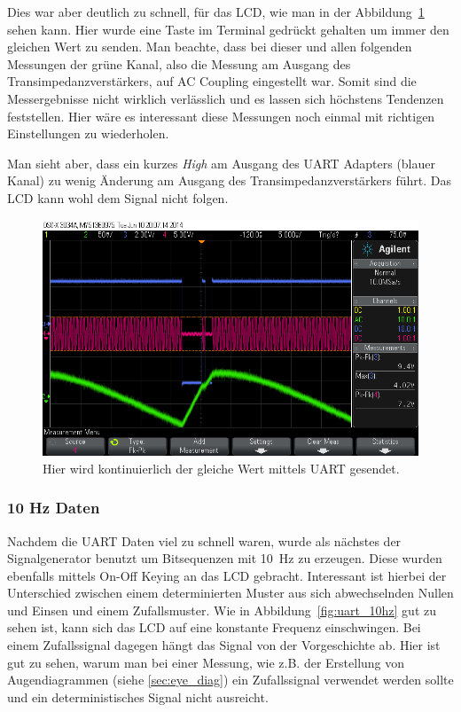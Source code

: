 \documentclass[12pt,a4paper]{article}
\begin{document}
Dies war aber deutlich zu schnell, für das LCD, wie man in der Abbildung~\ref{fig:uart_continous_key} sehen kann. Hier wurde eine Taste im Terminal gedrückt gehalten um immer den gleichen Wert zu senden. Man beachte, dass bei dieser und allen folgenden Messungen der grüne Kanal, also die Messung am Ausgang des Transimpedanzverstärkers, auf AC Coupling eingestellt war. Somit sind die Messergebnisse nicht wirklich verlässlich und es lassen sich höchstens Tendenzen feststellen. Hier wäre es interessant diese Messungen noch einmal mit richtigen Einstellungen zu wiederholen.

Man sieht aber, dass ein kurzes \textit{High} am Ausgang des UART Adapters (blauer Kanal) zu wenig Änderung am Ausgang des Transimpedanzverstärkers führt. Das LCD kann wohl dem Signal nicht folgen.


\begin{figure}[H]
  \centering
    \includegraphics[width=\textwidth]{../measurements/20140610/uart_continous_key/scope_0.png}
  \caption{Hier wird kontinuierlich der gleiche Wert mittels UART gesendet.}
  \label{fig:uart_continous_key}
\end{figure}

\subsubsection{10 Hz Daten}
Nachdem die UART Daten viel zu schnell waren, wurde als nächstes der Signalgenerator benutzt um Bitsequenzen mit \SI{10}{\hertz} zu erzeugen. Diese wurden ebenfalls mittels On-Off Keying an das LCD gebracht. Interessant ist hierbei der Unterschied zwischen einem determinierten Muster aus sich abwechselnden Nullen und Einsen und einem Zufallsmuster. Wie in Abbildung~\ref{fig:uart_10hz} gut zu sehen ist, kann sich das LCD auf eine konstante Frequenz einschwingen. Bei einem Zufallssignal dagegen hängt das Signal von der Vorgeschichte ab. Hier ist gut zu sehen, warum man bei einer Messung, wie z.B. der Erstellung von Augendiagrammen (siehe \ref{sec:eye_diag}) ein Zufallssignal verwendet werden sollte und ein deterministisches Signal nicht ausreicht.
\end{document}
